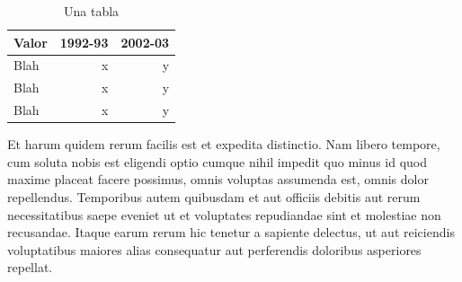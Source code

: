 \begin{table}[H]
\centering
    \begin{tabular}{lrr}
      \hline
      Valor & 1992-93 & 2002-03 \\
      \hline
      Blah & x & y \\
      Blah & x & y \\
      Blah & x & y \\
      \hline
    \end{tabular}
  \caption{Una tabla}
\end{table}




Et harum quidem rerum facilis est et expedita 
distinctio. Nam libero tempore, cum soluta nobis est eligendi optio cumque 
nihil impedit quo minus id quod maxime placeat facere possimus, omnis voluptas 
assumenda est, omnis dolor repellendus. Temporibus autem quibusdam et aut 
officiis debitis aut rerum necessitatibus saepe eveniet ut et voluptates 
repudiandae sint et molestiae non recusandae. Itaque earum rerum hic 
tenetur a sapiente delectus, ut aut reiciendis voluptatibus maiores 
alias consequatur aut perferendis doloribus asperiores repellat.

